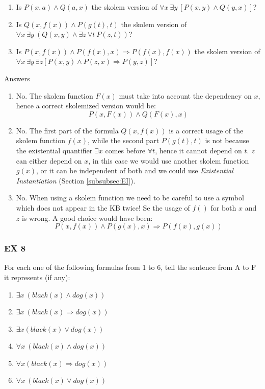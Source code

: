 \documentclass[10pt,a4paper]{article}
\begin{document}
\begin{enumerate}
\begin{enumerate}
\item Is $ P(x,a)\wedge Q(a,x)$ the skolem version of $\forall x\ \exists y\ [P(x,y)\wedge Q(y,x)]$?
\item Is $ Q(x,f(x))\wedge P(g(t),t)$ the skolem version of $\forall x\ \exists y\ (Q(x,y)\wedge \exists z\ \forall t\ P(z,t))$?
\item Is $P(x,f(x))\wedge P(f(x),x)\Rightarrow P(f(x),f(x))$ the skolem version of $\forall x\ \exists y\  \exists z[P(x,y)\wedge P(z,x)\Rightarrow P(y,z)]$?
\end{enumerate}
Answers
\begin{enumerate}
\item No. The skolem function $F(x)$ must take into account the dependency on $x$, hence a correct skolemized version would be:
\[P(x,F(x))\wedge Q(F(x),x)\]
\item No. The first part of the formula $Q(x,f(x))$ is a correct usage of the skolem function $f(x)$, while the second part $P(g(t),t)$ is not because the existential quantifier  $\exists x$ comes before $\forall t$, hence it cannot depend on $t$. $z$ can either depend on $x$, in this case we would use another skolem function $g(x)$, or it can be independent of both and we could use \textit{Existential Instantiation} (Section \ref{subsubsec:EI}). 
\item No. When using a skolem function we need to be careful to use a symbol which does not appear in the KB twice! Se the usage of $f()$ for both $x$ and $z$ is wrong. A good choice would have been:
\[P(x,f(x))\wedge P(g(x),x)\Rightarrow P(f(x),g(x))\]


\end{enumerate}

\subsubsection{EX 8}
For each one of the following formulas from 1 to 6, tell the sentence from A to F it represents (if any):
\begin{enumerate}

\item $\exists x\ (black(x) \wedge dog(x))$
\item $\exists x\ (black(x)\Rightarrow dog(x)) $
\item $\exists x(black(x) \vee dog(x))$
\item $\forall x\ (black(x) \wedge dog(x)) $
\item $\forall x(black(x)\Rightarrow dog(x))$
\item $\forall x\ (black(x) \vee dog(x))$
\end{enumerate}


\end{enumerate}
\end{document}
